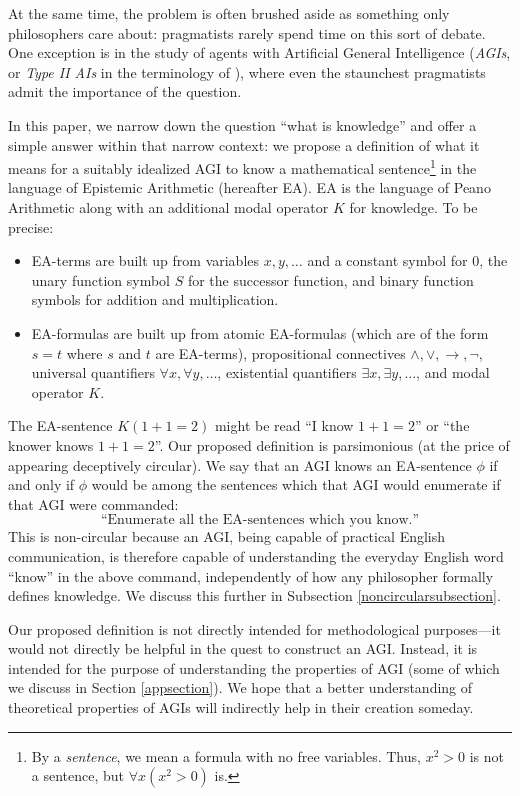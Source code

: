 \documentclass[runningheads]{llncs}
\begin{document}
At the same time, the problem is often brushed aside as something only
philosophers care about: pragmatists rarely spend time
on this sort of debate. One exception is in the study of
agents with Artificial General Intelligence
(\emph{AGIs}, or \emph{Type II AIs} in the
terminology of \cite{aliman2020error}), where even the staunchest
pragmatists admit the importance of the question.

In this paper, we narrow down the question ``what is knowledge'' and offer
a simple answer within that narrow context:
we propose a definition of what it means for a suitably idealized AGI to know
a mathematical sentence\footnote{By a \emph{sentence}, we mean a formula with
no free variables. Thus, $x^2>0$ is not a sentence, but
$\forall x (x^2>0)$ is.} in the language of Epistemic Arithmetic \cite{shapiro} (hereafter
EA). EA is
the language of Peano Arithmetic along with an additional modal operator $K$ for
knowledge. To be precise:
\begin{itemize}
  \item EA-terms are built up from variables $x,y,\ldots$ and a constant symbol for $0$,
  the unary function symbol $S$ for the successor function, and binary function symbols
  for addition and multiplication.
  \item EA-formulas are built up from atomic EA-formulas (which are of the form $s=t$
  where $s$ and $t$ are EA-terms), propositional connectives
  $\wedge,\vee,\rightarrow,\neg$, universal quantifiers $\forall x,\forall y,\ldots$,
  existential quantifiers $\exists x,\exists y,\ldots$, and modal operator $K$.
\end{itemize}
The EA-sentence $K(1+1=2)$ might be read ``I know $1+1=2$''
or ``the knower knows $1+1=2$''. Our
proposed definition is parsimonious (at the price of appearing
deceptively circular). We say that
an AGI knows an EA-sentence $\phi$
if and only if $\phi$ would be among the sentences which that AGI would
enumerate if that AGI were commanded:
\[
\text{``Enumerate all the EA-sentences which you know.''}
\]
This is non-circular because an AGI, being capable of practical English
communication, is therefore capable of understanding the everyday English word
``know'' in the above command, independently of how any philosopher formally
defines knowledge. We discuss this further in Subsection \ref{noncircularsubsection}.

Our proposed definition is not directly intended
for methodological purposes---it would not
directly be helpful in the quest to construct an AGI. Instead, it is intended for
the purpose of understanding the properties of AGI (some of which
we discuss in Section \ref{appsection}). We hope that a better
understanding of theoretical properties of AGIs will indirectly help in their
creation someday.
\end{document}

